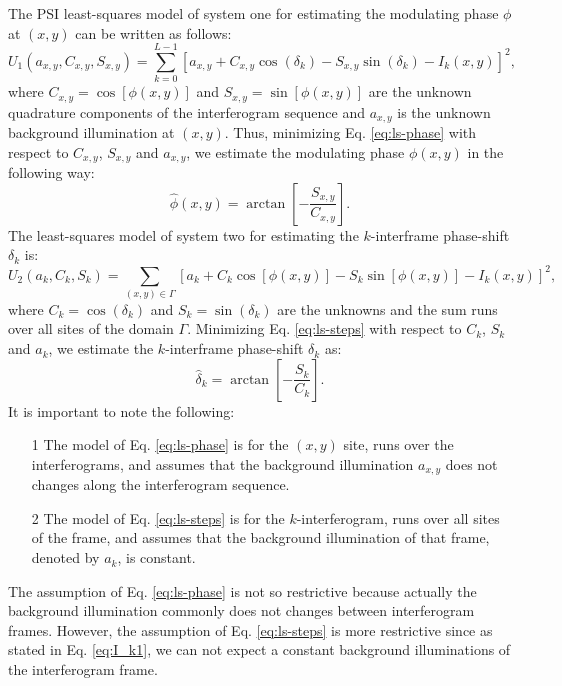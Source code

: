 \documentclass[letterpaper,12pt]{article}   %
\begin{document}
The PSI least-squares model of system one for estimating the
modulating phase $\phi$ at $(x,y)$ can be written as follows:
\begin{equation}
  U_1(a_{x,y},C_{x,y},S_{x,y}) = \sum_{k=0}^{L-1}\left[
    a_{x,y}+C_{x,y}\cos(\delta_k)-S_{x,y}\sin(\delta_k)-I_k(x,y)
  \right]^2, \label{eq:ls-phase}
\end{equation} 
where $C_{x,y}=\cos[\phi(x,y)]$ and $S_{x,y}=\sin[\phi(x,y)]$ are the
unknown quadrature components of the interferogram sequence and
$a_{x,y}$ is the unknown background illumination at $(x,y)$. Thus,
minimizing Eq. \eqref{eq:ls-phase} with respect to $C_{x,y}$,
$S_{x,y}$ and $a_{x,y}$, we estimate the modulating phase $\phi(x,y)$
in the following way:
\begin{equation}
  \hat\phi(x,y) = \arctan\left[-\frac{S_{x,y}}{C_{x,y}}\right].
\end{equation}
The least-squares model of system two for estimating the
$k$-interframe phase-shift $\delta_k$ is:
\begin{equation}
  U_2(a_k,C_k,S_k) = \sum_{(x,y)\in \Gamma}\left[
    a_k+C_k\cos[\phi(x,y)]-S_k\sin[\phi(x,y)]-I_k(x,y)
  \right]^2, \label{eq:ls-steps}
\end{equation} 
where $C_k=\cos(\delta_k)$ and $S_k=\sin(\delta_k)$ are the unknowns
and the sum runs over all sites of the domain $\Gamma$. Minimizing
Eq. \eqref{eq:ls-steps} with respect to $C_k$, $S_k$ and $a_k$, we
estimate the $k$-interframe phase-shift $\delta_k$ as:
\begin{equation}
  \hat\delta_k = \arctan\left[-\frac{S_k}{C_k}\right].
\end{equation}
It is important to note the following:
\begin{itemize}
\item[1] The model of Eq. \eqref{eq:ls-phase} is for the $(x,y)$ site,
  runs over the interferograms, and assumes that the background
  illumination $a_{x,y}$ does not changes along the interferogram
  sequence.
\item[2] The model of Eq. \eqref{eq:ls-steps} is for the
  $k$-interferogram, runs over all sites of the frame, and assumes
  that the background illumination of that frame, denoted by $a_k$, is
  constant.
\end{itemize}
The assumption of Eq. \eqref{eq:ls-phase} is not so restrictive
because actually the background illumination commonly does not changes
between interferogram frames. However, the assumption of
Eq. \eqref{eq:ls-steps} is more restrictive since as stated in
Eq. \eqref{eq:I_k1}, we can not expect a constant background
illuminations of the interferogram frame.
\end{document}
